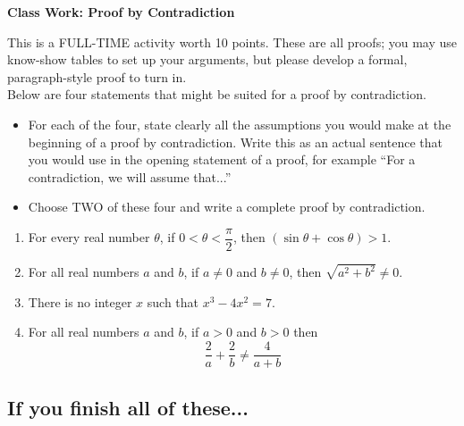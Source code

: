 \documentclass[11pt]{article}
\begin{document}
	
	\thispagestyle{empty}
	\renewcommand{\headrulewidth}{0.0pt}
	\thispagestyle{fancy}
	\lfoot{}
	\cfoot{}
	\rfoot{}	
	
	\vspace*{0in}

		\begin{center}
			\begin{large}
			\textbf{Class Work: Proof by Contradiction} \\
			\end{large}
		\end{center}
		
This is a FULL-TIME activity worth 10 points. These are all proofs; you may use know-show tables to set up your arguments, but please develop a formal, paragraph-style proof to turn in.\\


Below are four statements that might be suited for a proof by contradiction. 
\begin{itemize}
	\item For each of the four, state clearly all the assumptions you would make at the beginning of a proof by contradiction. Write this as an actual sentence that you would use in the opening statement of a proof, for example ``For a contradiction, we will assume that...''
	\item Choose TWO of these four and write a complete proof by contradiction. 
\end{itemize} 

\begin{enumerate}

\item For every real number $\theta$, if $0 < \theta < \dfrac{\pi}{2}$, then $(\sin \theta + \cos \theta) > 1$. 

\item For all real numbers $a$ and $b$, if $a \neq 0$ and $b \neq 0$, then $\sqrt{a^2 + b^2} \neq 0$. 

\item There is no integer $x$ such that $x^3 - 4x^2 = 7$. 

\item For all real numbers $a$ and $b$, if $a>0$ and $b>0$ then 
\[ \frac{2}{a} + \frac{2}{b} \neq \frac{4}{a+b}  \]
	
\end{enumerate}	
	
\subsection*{If you finish all of these...}
\end{document}
